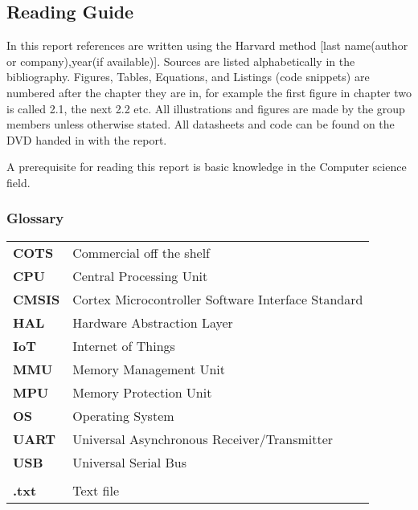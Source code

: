 \subsection*{Reading Guide}
\label{sub:reading_guide}

In this report references are written using the Harvard method [last name(author or company),year(if available)].
Sources are listed alphabetically in the bibliography.
Figures, Tables, Equations, and Listings (code snippets) are numbered after the chapter they are in,
for example the first figure in chapter two is called 2.1, the next 2.2 etc.
All illustrations and figures are made by the group members unless otherwise stated.
All datasheets and code can be found on the DVD handed in with the report.

A prerequisite for reading this report is basic knowledge in the 
Computer science field.

\subsubsection*{Glossary}
\begin{longtable}{l p{12cm}}
\textbf{COTS}		& \qquad \qquad Commercial off the shelf\\
\textbf{CPU}		& \qquad \qquad Central Processing Unit\\
\textbf{CMSIS}		& \qquad \qquad Cortex Microcontroller Software Interface Standard\\
\textbf{HAL}		& \qquad \qquad Hardware Abstraction Layer\\
\textbf{IoT}		& \qquad \qquad Internet of Things\\
\textbf{MMU}		& \qquad \qquad Memory Management Unit\\
\textbf{MPU}		& \qquad \qquad Memory Protection Unit\\
\textbf{OS}			& \qquad \qquad Operating System\\
\textbf{UART}		& \qquad \qquad Universal Asynchronous Receiver/Transmitter\\
\textbf{USB}		& \qquad \qquad Universal Serial Bus\\
					& \\
\textbf{.txt}		& \qquad \qquad Text file\\

\end{longtable}
